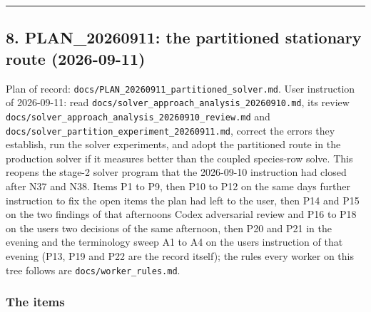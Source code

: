 \documentclass[english,a4paper]{my_memo}
\begin{document}
\begin{center}\rule{0.5\linewidth}{0.5pt}\end{center}

\subsection{8. PLAN\_20260911: the partitioned stationary route (2026-09-11)}\label{8-plan_20260911-the-partitioned-stationary-route-2026-09-11}

Plan of record: \texttt{docs/PLAN\_20260911\_partitioned\_solver.md}. User instruction
of 2026-09-11: read \texttt{docs/solver\_approach\_analysis\_20260910.md}, its review
\texttt{docs/solver\_approach\_analysis\_20260910\_review.md} and
\texttt{docs/solver\_partition\_experiment\_20260911.md}, correct the errors they
establish, run the solver experiments, and adopt the partitioned route in the
production solver if it measures better than the coupled species-row solve.
This reopens the stage-2 solver program that the 2026-09-10 instruction had
closed after N37 and N38. Items P1 to P9, then P10 to P12 on the same day\textquotesingle s
further instruction to fix the open items the plan had left to the user, then
P14 and P15 on the two findings of that afternoon\textquotesingle s Codex adversarial review
and P16 to P18 on the user\textquotesingle s two decisions of the same afternoon, then P20 and
P21 in the evening and the terminology sweep A1 to A4 on the user\textquotesingle s instruction
of that evening (P13, P19 and P22 are the record itself); the rules every worker
on this tree follows are \texttt{docs/worker\_rules.md}.

\subsubsection{The items}\label{the-items}
\end{document}
